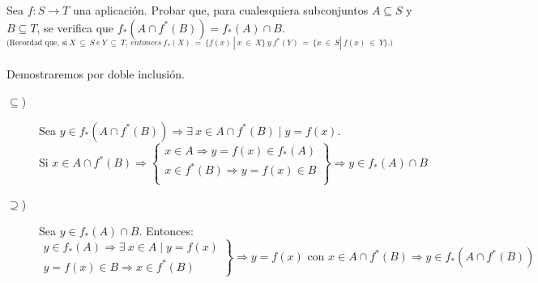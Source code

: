 \documentclass[12pt]{article}
\begin{document}
    \begin{ejercicio}[1.25 puntos]
        Sea $f : S \rightarrow T$ una aplicación. Probar que, para cualesquiera subconjuntos $A \subseteq S$ y
        $B \subseteq T$, se verifica que $f_*(A \cap f^*(B)) = f_*(A) \cap B$. $_{\text{(Recordad   que, si} \ X \ \subseteq \ S \ e \ Y \ \subseteq \ T , \ entonces \
        f_*(X) \ = \ \{f(x) \ | \ x \ \in \ X\} \ y \ f^*(Y) \ = \ \{x \ \in \  S | \ f(x) \ \in \ Y\}.)}$ \\ \\
        
        Demostraremos por doble inclusión.
        \begin{description}
            \item[$\subseteq$)] Sea $y \in f_*(A \cap f^*(B)) \Rightarrow \exists \ x \in A \cap f^*(B) \mid y =f(x)$.
            \begin{equation*}
                \text{Si } x \in A \cap f^*(B) \Rightarrow \left\{\begin{array}{l}
                    x \in A \Rightarrow y = f(x) \in f_*(A) \\
                    x \in f^*(B) \Rightarrow y = f(x) \in B\\
                \end{array}\right\} \Rightarrow y \in f_*(A) \cap B
            \end{equation*}

            \item[$\supseteq$)] Sea $y \in f_*(A) \cap B$. Entonces:
            \begin{equation*}
                \left.\begin{array}{l}
                    y \in f_*(A) \Rightarrow \exists \ x \in A \mid y = f(x) \\
                    y = f(x) \in B \Rightarrow x \in f^*(B)
                \end{array}\right\} \Rightarrow y=f(x) \text{ con } x\in A \cap f^*(B) \Rightarrow y \in f_*(A \cap f^*(B)) 
            \end{equation*}
        \end{description}
    \end{ejercicio}
\end{document}
